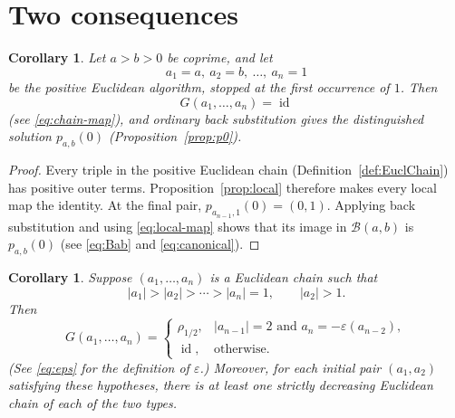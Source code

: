 \documentclass[12pt,letterpaper]{article}
\numberwithin{equation}{section}
\newcommand{\B}{\mathcal B}
\newcommand{\id}{\operatorname{id}}
\newcommand{\eps}{\varepsilon}
\theoremstyle{plain}
\newtheorem{corollary}[theorem]{Corollary}
\theoremstyle{definition}
\begin{document}
\section{Two consequences}

\begin{corollary}
Let $a>b>0$ be coprime, and let
\[
 a_1=a,\ a_2=b,\ \ldots,\ a_n=1
\]
be the positive Euclidean algorithm, stopped at the first occurrence of $1$. Then
\[
 G(a_1,\ldots,a_n)=\id
\]
(see \eqref{eq:chain-map}), and ordinary back substitution gives the distinguished solution $p_{a,b}(0)$ (Proposition~\ref{prop:p0}).
\end{corollary}

\begin{proof}
Every triple in the positive Euclidean chain (Definition~\ref{def:EuclChain}) has positive outer terms. Proposition~\ref{prop:local} therefore makes every local map the identity. At the final pair, $p_{a_{n-1},1}(0)=(0,1)$. Applying back substitution and using \eqref{eq:local-map} shows that its image in $\B(a,b)$ is $p_{a,b}(0)$ (see \eqref{eq:Bab} and \eqref{eq:canonical}).
\end{proof}

\begin{corollary}
Suppose $(a_1,\ldots,a_n)$ is a Euclidean chain such that
\[
 |a_1|>|a_2|>\cdots>|a_n|=1,
 \qquad |a_2|>1.
\]
Then
\[
 G(a_1,\ldots,a_n)=
 \begin{cases}
  \rho_{1/2},& |a_{n-1}|=2\text{ and }a_n=-\eps(a_{n-2}),\\
  \id,&\text{otherwise.}
 \end{cases}
\]
(See \eqref{eq:eps} for the definition of $\eps$.) Moreover, for each initial pair $(a_1,a_2)$ satisfying these hypotheses, there is at least one strictly decreasing Euclidean chain of each of the two types.
\end{corollary}
\end{document}

